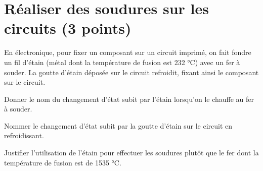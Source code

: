 \section{Réaliser des soudures sur les circuits (3 points)}

En électronique, pour fixer un composant sur un circuit imprimé, on fait fondre un fil d'étain (métal dont la température de fusion est 232 °C) avec un fer à souder. La goutte d'étain déposée sur le circuit refroidit, fixant ainsi le composant sur le circuit.

\begin{questions}
	\question[1] Donner le nom du changement d'état subit par l'étain lorsqu'on le chauffe au fer à souder.
	
	\question[1] Nommer le changement d'état subit par la goutte d'étain sur le circuit en refroidissant.
	
	\question[1] Justifier l'utilisation de l'étain pour effectuer les soudures plutôt que le fer dont la température de fusion est de \num{1535} °C.  
\end{questions}
